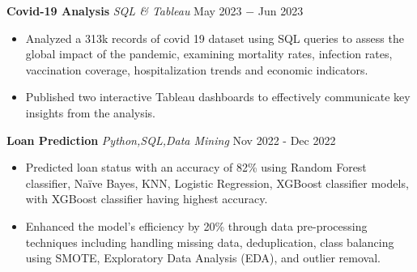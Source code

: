\documentclass{article}
\begin{document}
\noindent \textbf{Covid-19 Analysis} \textit{SQL \& Tableau} \hfill  May 2023 $-$ Jun 2023
\begin{itemize}[noitemsep,nolistsep,leftmargin=*]
\item {Analyzed a 313k records of covid 19 dataset using SQL queries to assess the global impact of the pandemic, examining
mortality rates, infection rates, vaccination coverage, hospitalization trends and economic indicators.}
\item {Published two interactive Tableau dashboards to effectively communicate key insights from the analysis.}
\end{itemize}

\noindent \textbf{Loan Prediction} \textit{Python,SQL,Data Mining} \hfill  Nov 2022 - Dec 2022
\begin{itemize}[noitemsep,nolistsep,leftmargin=*]
\item {Predicted loan status with an accuracy of 82\% using Random Forest classifier, Naïve Bayes, KNN, Logistic Regression,
XGBoost classifier models, with XGBoost classifier having highest accuracy.}
\item {Enhanced the model's efficiency by 20\% through data pre-processing techniques including handling missing data,
deduplication, class balancing using SMOTE, Exploratory Data Analysis (EDA), and outlier removal. }
\end{itemize}





\end{document}
